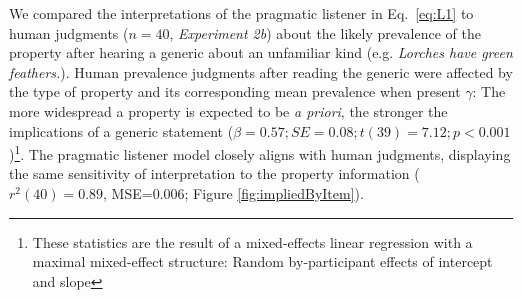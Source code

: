 \documentclass{pnastwo}
\begin{document}
\begin{article}
We compared the interpretations of the pragmatic listener in Eq.~\ref{eq:L1} to human judgments ($n=40$, {\it Experiment 2b}) about the likely prevalence of the property after hearing a generic about an unfamiliar kind (e.g. \emph{Lorches have green feathers.}). %
Human prevalence judgments after reading the generic were affected by the type of property and its corresponding mean prevalence when present $\gamma$: The more widespread a property is expected to be \emph{a priori}, the stronger the implications of a generic statement ($\beta = 0.57; SE = 0.08; t(39) = 7.12; p < 0.001$)\footnote{These statistics are the result of a mixed-effects linear regression with a maximal mixed-effect structure: Random by-participant effects of intercept and slope}. 
The pragmatic listener model closely aligns with human judgments, displaying the same sensitivity of interpretation to the property information ($r^2(40)=0.89$, MSE=0.006; Figure \ref{fig:impliedByItem}). 


\end{article}
\end{document}
